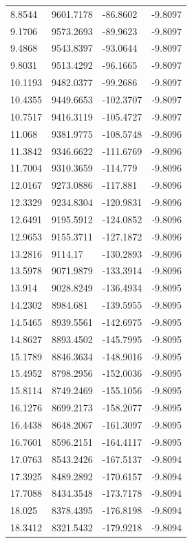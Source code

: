 \begin{table}[H]
\begin{tabular}{llll}
8.8544 & 9601.7178 & -86.8602 & -9.8097 \\
9.1706 & 9573.2693 & -89.9623 & -9.8097 \\
9.4868 & 9543.8397 & -93.0644 & -9.8097 \\
9.8031 & 9513.4292 & -96.1665 & -9.8097 \\
10.1193 & 9482.0377 & -99.2686 & -9.8097 \\
10.4355 & 9449.6653 & -102.3707 & -9.8097 \\
10.7517 & 9416.3119 & -105.4727 & -9.8097 \\
11.068 & 9381.9775 & -108.5748 & -9.8096 \\
11.3842 & 9346.6622 & -111.6769 & -9.8096 \\
11.7004 & 9310.3659 & -114.779 & -9.8096 \\
12.0167 & 9273.0886 & -117.881 & -9.8096 \\
12.3329 & 9234.8304 & -120.9831 & -9.8096 \\
12.6491 & 9195.5912 & -124.0852 & -9.8096 \\
12.9653 & 9155.3711 & -127.1872 & -9.8096 \\
13.2816 & 9114.17 & -130.2893 & -9.8096 \\
13.5978 & 9071.9879 & -133.3914 & -9.8096 \\
13.914 & 9028.8249 & -136.4934 & -9.8095 \\
14.2302 & 8984.681 & -139.5955 & -9.8095 \\
14.5465 & 8939.5561 & -142.6975 & -9.8095 \\
14.8627 & 8893.4502 & -145.7995 & -9.8095 \\
15.1789 & 8846.3634 & -148.9016 & -9.8095 \\
15.4952 & 8798.2956 & -152.0036 & -9.8095 \\
15.8114 & 8749.2469 & -155.1056 & -9.8095 \\
16.1276 & 8699.2173 & -158.2077 & -9.8095 \\
16.4438 & 8648.2067 & -161.3097 & -9.8095 \\
16.7601 & 8596.2151 & -164.4117 & -9.8095 \\
17.0763 & 8543.2426 & -167.5137 & -9.8094 \\
17.3925 & 8489.2892 & -170.6157 & -9.8094 \\
17.7088 & 8434.3548 & -173.7178 & -9.8094 \\
18.025 & 8378.4395 & -176.8198 & -9.8094 \\
18.3412 & 8321.5432 & -179.9218 & -9.8094 \\

\end{tabular}
\end{table}
